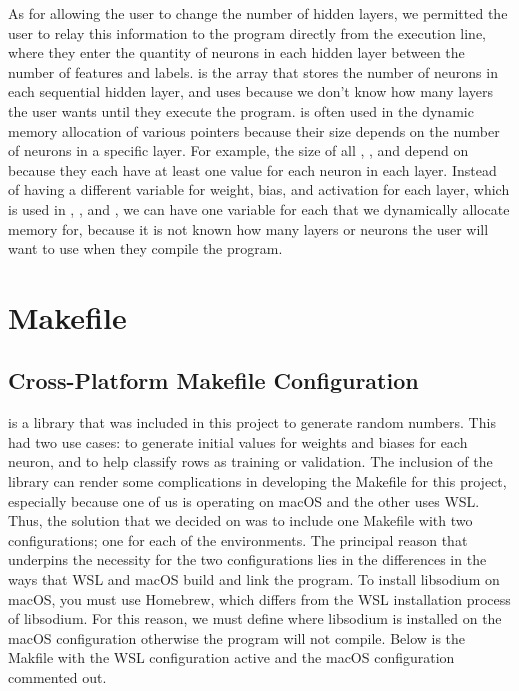 \documentclass[12pt]{article}
\begin{document}
As for allowing the user to change the number of hidden layers, we permitted the user to relay this information to the program directly from the execution line, where they enter the quantity of neurons in each hidden layer between the number of features and labels.  is the array that stores the number of neurons in each sequential hidden layer, and uses  because we don’t know how many layers the user wants until they execute the program.  is often used in the dynamic memory allocation of various pointers because their size depends on the number of neurons in a specific layer. For example, the size of all , , and  depend on  because they each have at least one value for each neuron in each layer. Instead of having a different variable for weight, bias, and activation for each layer, which is used in , , and , we can have one variable for each that we dynamically allocate memory for, because it is not known how many layers or neurons the user will want to use when they compile the program.

\section{Makefile}

\subsection{Cross-Platform Makefile Configuration}

 is a library that was included in this project to generate random numbers. This had two use cases: to generate initial values for weights and biases for each neuron, and to help classify rows as training or validation. The inclusion of the  library can render some complications in developing the Makefile for this project, especially because one of us is operating on macOS and the other uses WSL. Thus, the solution that we decided on was to include one Makefile with two configurations; one for each of the environments. The principal reason that underpins the necessity for the two configurations lies in the differences in the ways that WSL and macOS build and link the program. To install libsodium on macOS, you must use Homebrew, which differs from the WSL installation process of libsodium. For this reason, we must define where libsodium is installed on the macOS configuration otherwise the program will not compile. Below is the Makfile with the WSL configuration active and the macOS configuration commented out.
\end{document}
